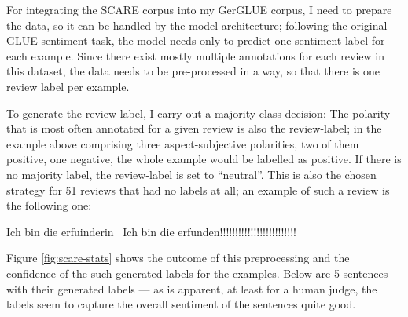 




For integrating the SCARE corpus into my GerGLUE corpus, I need to prepare the data, so it
can be handled by the model architecture; following the original GLUE sentiment task, the
model needs only to predict one sentiment label for each example. Since there exist mostly
multiple annotations for each review in this dataset, the data needs to be pre-processed
in a way, so that there is one review label per example.

To generate the review label, I carry out a majority class decision:
The polarity that is most often annotated for a given review is also the review-label; in the
example above comprising three aspect-subjective polarities, two of them positive, one negative,
the whole example would be labelled as positive.
If there is no majority label, the review-label is set to ``neutral''.
This is also the chosen strategy for 51 reviews that had no labels at all; an example of such a
review is the following one:

\begin{examples}
  \item Ich bin die erfuinderin \textbar \textbar\ Ich bin die erfunden!!!!!!!!!!!!!!!!!!!!!!!!!
\end{examples}

Figure \ref{fig:scare-stats} shows the outcome of this preprocessing and
the confidence of the such generated labels for the examples. Below are 5 sentences with their
generated labels --- as is apparent, at least for a human judge, the labels seem to capture the
overall sentiment of the sentences quite good.


